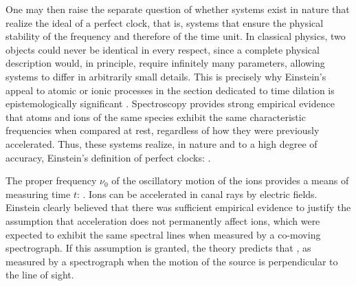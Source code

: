 \documentclass[submitted,12pt]{article}
\begin{document}
One may then raise the separate question of whether systems exist in nature that realize the ideal of a perfect clock, that is, systems that ensure the physical stability of the frequency and therefore of the time unit. In classical physics, two objects could never be identical in every respect, since a complete physical description would, in principle, require infinitely many parameters, allowing systems to differ in arbitrarily small details. This is precisely why Einstein’s appeal to atomic or ionic processes in the section dedicated to time dilation is epistemologically significant \citep{Pierseaux2003}. Spectroscopy provides strong empirical evidence that atoms and ions of the same species exhibit the same characteristic frequencies when compared at rest, regardless of how they were previously accelerated. Thus, these systems realize, in nature and to a high degree of accuracy, Einstein's definition of perfect clocks:  \citep[132\psq]{Einstein1910}.

The proper frequency $\nu_0$ of the oscillatory motion of the ions provides a means of measuring time $t$:  \citep[133]{Einstein1910}. Ions can be accelerated in canal rays by electric fields. Einstein clearly believed that there was sufficient empirical evidence to justify the assumption that acceleration does not permanently affect ions, which were expected to exhibit the same spectral lines when measured by a co-moving spectrograph. If this assumption is granted, the theory predicts that  \citep[133\me]{Einstein1910}, as measured by a spectrograph when the motion of the source is perpendicular to the line of sight.
\end{document}
